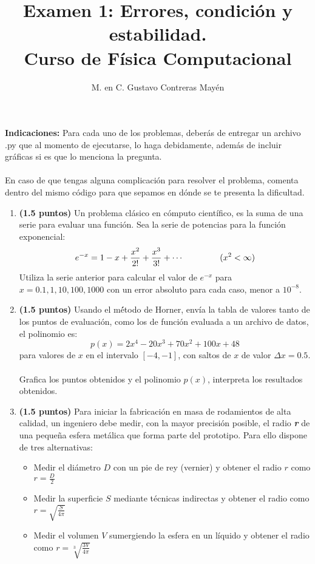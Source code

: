 \documentclass[11pt]{article}
\title{Examen 1: Errores, condición y estabilidad. \\ Curso de Física Computacional}
\author{M. en C. Gustavo Contreras Mayén}
\date{ }
\begin{document}
\maketitle
\fontsize{14}{14}\selectfont
\textbf{Indicaciones: } Para cada uno de los problemas, deber\'{a}s de entregar un archivo .py que al momento de ejecutarse, lo haga debidamente, adem\'{a}s de incluir gr\'{a}ficas si es que lo menciona la pregunta.
\\
\\
En caso de que tengas alguna complicaci\'{o}n para resolver el problema, comenta dentro del mismo c\'{o}digo para que sepamos en d\'{o}nde se te presenta la dificultad.
\begin{enumerate}
\item \textbf{(1.5 puntos) }Un problema cl\'{a}sico en c\'{o}mputo cient\'{i}fico, es la suma de una serie para evaluar una funci\'{o}n. Sea la serie de potencias para la funci\'{o}n exponencial:
\[e^{-x} = 1 - x + \dfrac{x^{2}}{2!} + \dfrac{x^{3}}{3!} +\cdots \hspace{1.5cm} (x^{2} < \infty)  \]
Utiliza la serie anterior para calcular el valor de $e^{-x}$ para $x=0.1,1,10, 100, 1000$ con un error absoluto para cada caso, menor a $10^{-8}$.
\item \textbf{(1.5 puntos) }Usando el m\'{é}todo de Horner, env\'{i}a la tabla de valores tanto de los puntos de evaluaci\'{o}n, como los de funci\'{o}n evaluada a un archivo de datos, el polinomio es:
\[p(x)= 2x^{4} - 20x^{3} + 70x^{2}+ 100x+48 \]
para valores de $x$ en el intervalo $[-4,-1]$, con saltos de $x$ de valor $\Delta x = 0.5$.
\\
\\
Grafica los puntos obtenidos y el polinomio $p(x)$, interpreta los resultados obtenidos.
\item \textbf{(1.5 puntos) }Para iniciar la fabricaci\'{o}n en masa de rodamientos de alta calidad, un ingeniero debe medir, con la mayor precisi\'{o}n posible, el radio \textbf{\textit{r}} de una pequeña esfera met\'{a}lica que forma parte del prototipo. Para ello dispone de tres alternativas:
\begin{itemize}
\item Medir el di\'{a}metro $D$ con un pie de rey (vernier) y obtener el radio $r$ como $r = \frac{D}{2}$
\item Medir la superficie $S$ mediante t\'{e}cnicas indirectas y obtener el radio como $r = \sqrt{\frac{S}{4\pi}}$
\item Medir el volumen $V$ sumergiendo la esfera en un l\'{i}quido y obtener el radio como $r = \sqrt[3]{\frac{3V}{4\pi}}$

\end{itemize}
\end{enumerate}
\end{document}
